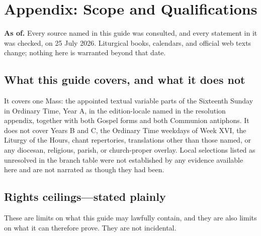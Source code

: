 \section*{Appendix: Scope and Qualifications}

\textbf{As of.} Every source named in this guide was consulted, and every
statement in it was checked, on 25 July 2026. Liturgical books, calendars, and
official web texts change; nothing here is warranted beyond that date.

\subsection*{What this guide covers, and what it does not}

It covers one Mass: the appointed textual variable parts of the Sixteenth
Sunday in Ordinary Time, Year A, in the edition-locale named in the resolution
appendix, together with both Gospel forms and both Communion antiphons. It does
not cover Years B and C, the Ordinary Time weekdays of Week XVI, the Liturgy of
the Hours, chant repertories, translations other than those named, or any
diocesan, religious, parish, or church-proper overlay. Local selections listed
as unresolved in the branch table were not established by any evidence
available here and are not narrated as though they had been.

\subsection*{Rights ceilings---stated plainly}

These are limits on what this guide may lawfully contain, and they are also
limits on what it can therefore prove. They are not incidental.

